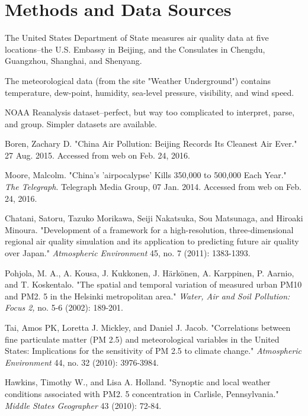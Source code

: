 \documentclass[11pt]{article} %
\begin{document}
\section{Methods and Data Sources}

The United States Department of State measures
air quality data at five locations--the U.S. Embassy in
Beijing, and the Consulates in Chengdu, Guangzhou,
Shanghai, and Shenyang. 

The meteorological data (from the site "Weather Underground") 
contains temperature, dew-point, humidity, sea-level
pressure, visibility, and wind speed.

NOAA Reanalysis dataset--perfect, but way too complicated
to interpret, parse, and group. Simpler datasets
are available.


\begin{thebibliography}{1}

Boren, Zachary D. "China Air Pollution: Beijing Records Its Cleanest Air Ever." 27 Aug. 2015. Accessed from web on Feb. 24, 2016.

Moore, Malcolm. "China's 'airpocalypse' Kills 350,000 to 500,000 Each Year." \textit{The Telegraph}. Telegraph Media Group, 07 Jan. 2014. Accessed from web on Feb. 24, 2016.

Chatani, Satoru, Tazuko Morikawa, Seiji Nakatsuka, Sou Matsunaga, and Hiroaki Minoura. "Development of a framework for a high-resolution, three-dimensional regional air quality simulation and its application to predicting future air quality over Japan." \textit{Atmospheric Environment} 45, no. 7 (2011): 1383-1393.

Pohjola, M. A., A. Kousa, J. Kukkonen, J. Härkönen, A. Karppinen, P. Aarnio, and T. Koskentalo. "The spatial and temporal variation of measured urban PM10 and PM2. 5 in the Helsinki metropolitan area." \textit{Water, Air and Soil Pollution: Focus 2,} no. 5-6 (2002): 189-201.

Tai, Amos PK, Loretta J. Mickley, and Daniel J. Jacob. "Correlations between fine particulate matter (PM 2.5) and meteorological variables in the United States: Implications for the sensitivity of PM 2.5 to climate change." \textit{Atmospheric Environment} 44, no. 32 (2010): 3976-3984.

Hawkins, Timothy W., and Lisa A. Holland. "Synoptic and local weather conditions associated with PM2. 5 concentration in Carlisle, Pennsylvania." \textit{Middle States Geographer} 43 (2010): 72-84.

\end{thebibliography}
\end{document}
